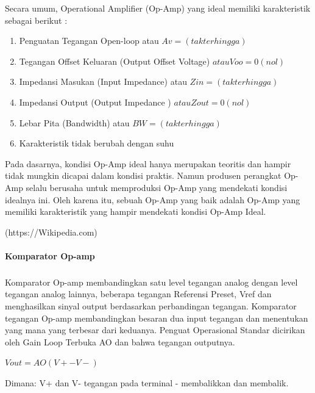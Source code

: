 \documentclass[12pt,a4paper]{article}
\begin{document}
Secara umum, Operational Amplifier (Op-Amp) yang ideal memiliki karakteristik sebagai berikut :
\begin{enumerate}
\item Penguatan Tegangan Open-loop atau $Av = (tak terhingga)$
\item Tegangan Offset Keluaran (Output Offset Voltage) $atau Voo = 0 (nol)$
\item Impedansi Masukan (Input Impedance) atau $Zin=(tak terhingga)$
\item Impedansi Output (Output Impedance ) $atau Zout = 0 (nol)$
\item Lebar Pita (Bandwidth) atau $BW =(tak terhingga)$
\item Karakteristik tidak berubah dengan suhu
\end{enumerate}

Pada dasarnya, kondisi Op-Amp ideal hanya merupakan teoritis dan hampir tidak mungkin dicapai dalam kondisi praktis. Namun produsen perangkat Op-Amp selalu berusaha untuk memproduksi Op-Amp yang mendekati kondisi idealnya ini. Oleh karena itu, sebuah Op-Amp yang baik adalah Op-Amp yang memiliki karakteristik yang hampir mendekati kondisi Op-Amp Ideal.


 


\begin{flushright}
(https://Wikipedia.com) 
\end{flushright}

\paragraph{ }
\textbf{Komparator Op-amp}
\subparagraph{ }
	Komparator Op-amp membandingkan satu level tegangan analog dengan level tegangan analog lainnya, beberapa tegangan Referensi Preset, Vref dan menghasilkan sinyal output berdasarkan perbandingan tegangan. Komparator tegangan Op-amp membandingkan besaran dua input tegangan dan menentukan yang mana yang terbesar dari keduanya. Penguat Operasional Standar dicirikan oleh Gain Loop Terbuka AO dan bahwa tegangan outputnya.
	
	\begin{center}
	$ Vout = AO (V+ - V-)$
	\end{center}
	Dimana: V+ dan V- tegangan pada terminal - membalikkan dan membalik.
\end{document}
